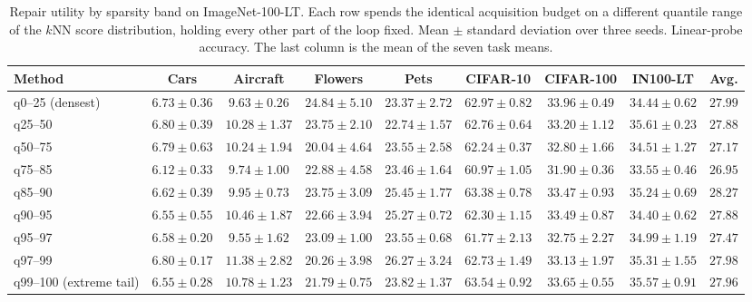 \begin{table}[t]
\centering
\small
\setlength{\tabcolsep}{4pt}
\caption{Repair utility by sparsity band on ImageNet-100-LT. Each row spends the identical acquisition budget on a different quantile range of the $k$NN score distribution, holding every other part of the loop fixed. Mean $\pm$ standard deviation over three seeds. Linear-probe accuracy. The last column is the mean of the seven task means.}
\label{tab:percentile-utility-full-linear}
\begin{adjustbox}{max width=\textwidth}
\begin{tabular}{lcccccccc}
\toprule
Method & Cars & Aircraft & Flowers & Pets & CIFAR-10 & CIFAR-100 & IN100-LT & Avg. \\
\midrule
q0--25 (densest) & $6.73\pm0.36$ & $9.63\pm0.26$ & $24.84\pm5.10$ & $23.37\pm2.72$ & $62.97\pm0.82$ & $33.96\pm0.49$ & $34.44\pm0.62$ & $27.99$ \\
q25--50 & $6.80\pm0.39$ & $10.28\pm1.37$ & $23.75\pm2.10$ & $22.74\pm1.57$ & $62.76\pm0.64$ & $33.20\pm1.12$ & $35.61\pm0.23$ & $27.88$ \\
q50--75 & $6.79\pm0.63$ & $10.24\pm1.94$ & $20.04\pm4.64$ & $23.55\pm2.58$ & $62.24\pm0.37$ & $32.80\pm1.66$ & $34.51\pm1.27$ & $27.17$ \\
q75--85 & $6.12\pm0.33$ & $9.74\pm1.00$ & $22.88\pm4.58$ & $23.46\pm1.64$ & $60.97\pm1.05$ & $31.90\pm0.36$ & $33.55\pm0.46$ & $26.95$ \\
q85--90 & $6.62\pm0.39$ & $9.95\pm0.73$ & $23.75\pm3.09$ & $25.45\pm1.77$ & $63.38\pm0.78$ & $33.47\pm0.93$ & $35.24\pm0.69$ & $28.27$ \\
q90--95 & $6.55\pm0.55$ & $10.46\pm1.87$ & $22.66\pm3.94$ & $25.27\pm0.72$ & $62.30\pm1.15$ & $33.49\pm0.87$ & $34.40\pm0.62$ & $27.88$ \\
q95--97 & $6.58\pm0.20$ & $9.55\pm1.62$ & $23.09\pm1.00$ & $23.55\pm0.68$ & $61.77\pm2.13$ & $32.75\pm2.27$ & $34.99\pm1.19$ & $27.47$ \\
q97--99 & $6.80\pm0.17$ & $11.38\pm2.82$ & $20.26\pm3.98$ & $26.27\pm3.24$ & $62.73\pm1.49$ & $33.13\pm1.97$ & $35.31\pm1.55$ & $27.98$ \\
q99--100 (extreme tail) & $6.55\pm0.28$ & $10.78\pm1.23$ & $21.79\pm0.75$ & $23.82\pm1.37$ & $63.54\pm0.92$ & $33.65\pm0.55$ & $35.57\pm0.91$ & $27.96$ \\
\bottomrule
\end{tabular}
\end{adjustbox}
\end{table}
